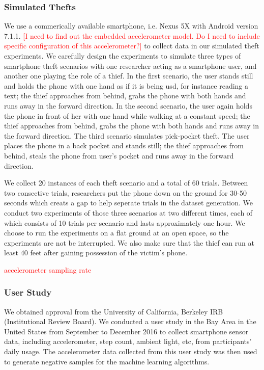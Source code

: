 \documentclass{soups}
\begin{document}
\subsubsection{Simulated Thefts}
We use a commerically available smartphone, i.e. Nexus 5X with Android version 7.1.1. \textcolor{red}{[I need to find out the embedded accelerometer model. Do I need to include specific configuration of this accelerometer?]} to collect data in our simulated theft experiments. We carefully design the experiments to simulate three types of smartphone theft scenarios with one researcher acting as a smartphone user, and another one playing the role of a thief. In the first scenario, the user stands still and holds the phone with one hand as if it is being usd, for instance reading a text; the thief approaches from behind, grabs the phone with both hands and runs away in the forward direction. In the second scenario, the user again holds the phone in front of her with one hand while walking at a constant speed; the thief approaches from behind, grabs the phone with both hands and runs away in the forward direction. The third scenario simulates pick-pocket theft. The user places the phone in a back pocket and stands still; the thief approaches from behind, steals the phone from user's pocket and runs away in the forward direction.

We collect 20 instances of each theft scenario and a total of 60 trials. Between two consective trials, researchers put the phone down on the ground for 30-50 seconds which creats a gap to help seperate trials in the dataset generation. We conduct two experiments of those three scenarios at two different times, each of which consists of 10 trials per scenario and lasts approximately one hour. We choose to run the experiments on a flat ground at an open space, so the experiments are not be interrupted. We also make sure that the thief can run at least 40 feet after gaining possession of the victim's phone.

\textcolor{red}{accelerometer sampling rate}



\subsubsection{User Study}
We obtained approval from the University of California, Berkeley IRB (Institutional Review Board). We conducted a user study in the Bay Area in the United States from September to December 2016 to collect smartphone sensor data, including accelerometer, step count, ambient light, etc, from participants' daily usage. The accelerometer data collected from this user study was then used to generate negative samples for the machine learning algorithms.
\end{document}
